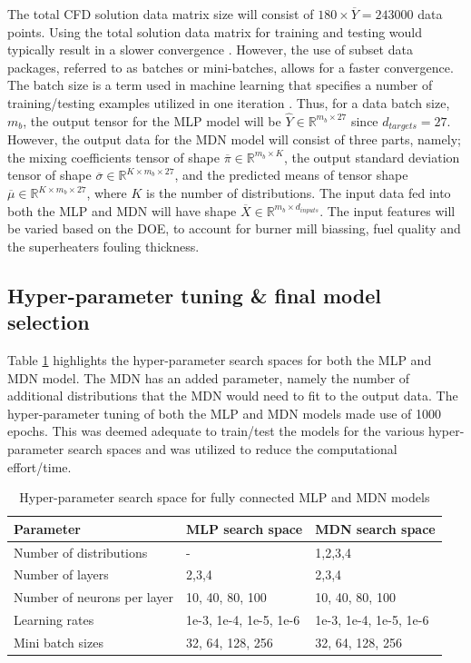 \documentclass[a4paper,fleqn]{cas-sc}
\begin{document}
The total CFD solution data matrix size will consist of $180\times\overline{Y}=243000$ data points. Using the total solution data matrix for training and testing would typically result in a slower convergence \cite{goodfellow}. However, the use of subset data packages, referred to as batches or mini-batches, allows for a faster convergence. The batch size is a term used in machine learning that specifies a number of training/testing examples utilized in one iteration \cite{Wheeler2019}. Thus, for a data batch size, $m_b$, the output tensor for the MLP model will be $\hat{Y}\in \mathbb{R}^{m_b\times 27}$ since $d_{targets}=27$. However, the output data for the MDN model will consist of three parts, namely; the mixing coefficients tensor of shape  $\overline{\pi}\in \mathbb{R}^{m_b \times K}$, the output standard deviation tensor of shape $\overline{\sigma}\in \mathbb{R}^{K\times m_b\times 27}$, and the predicted means of tensor shape $\overline{\mu}\in \mathbb{R}^{K\times m_b\times 27}$, where $K$ is the number of distributions. The input data fed into both the MLP and MDN will have shape $\overline{X}\in \mathbb{R}^{m_b\times d_{inputs}}$. The input features will be varied based on the DOE, to account for burner mill biassing, fuel quality and the superheaters fouling thickness.

\subsection{Hyper-parameter tuning \& final model selection}\label{sec_hyper}
Table \ref{tbl_tuning} highlights the hyper-parameter search spaces for both the MLP and MDN model. The MDN has an added parameter, namely the number of additional distributions that the MDN would need to fit to the output data. The hyper-parameter tuning of both the MLP and MDN models made use of 1000 epochs. This was deemed adequate to train/test the models for the various hyper-parameter search spaces and was utilized to reduce the computational effort/time.
\begin{table}[pos=h]
\caption{Hyper-parameter search space for fully connected MLP and MDN models}\label{tbl_tuning}
\begin{tabular*}{\tblwidth}{p{}p{}p{}}
\toprule
 Parameter& MLP search space & MDN search space \\ %
\midrule
 Number of distributions & - & 1,2,3,4  \\
 Number of layers & 2,3,4 & 2,3,4\\
 Number of neurons per layer & 10, 40, 80, 100  & 10, 40, 80, 100\\
 Learning rates & 1e-3, 1e-4, 1e-5, 1e-6 &  1e-3, 1e-4, 1e-5, 1e-6   \\
 Mini batch sizes  &32, 64, 128, 256 &32, 64, 128, 256  \\
\bottomrule
\end{tabular*}
\end{table}
\end{document}
